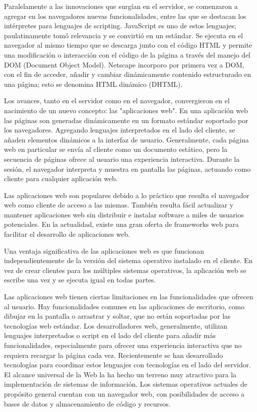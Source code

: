 \documentclass[a4paper]{report}
\begin{document}
Paralelamente a las innovaciones que surgían en el servidor, se comenzaron a 
agregar en los navegadores nuevas funcionalidades, entre las que se destacan los 
intérpretes para lenguajes de scripting. JavaScript es uno de estos lenguajes; 
paulatinamente tomó relevancia y se convirtió en un estándar. Se ejecuta en 
el navegador al mismo tiempo que se descarga junto con el código HTML y permite 
una modificación o interacción con el código de la página a través del manejo del 
DOM (Document Object Model). Netscape incorporo por primera vez a DOM, con el 
fin de acceder, añadir y cambiar dinámicamente contenido estructurado en una página; 
esto se denomina HTML dinámico (DHTML).


Los avances, tanto en el servidor como en el navegador, convergieron en el nacimiento
de un nuevo concepto: las "aplicaciones web". En una aplicación web las páginas son 
generadas dinámicamente en un formato estándar soportado por los navegadores. 
Agregando lenguajes interpretados en el lado del cliente, se añaden elementos 
dinámicos a la interfaz de usuario. Generalmente, cada página web en particular 
se envía al cliente como un documento estático, pero la secuencia de páginas 
ofrece al usuario una experiencia interactiva. Durante la sesión, el navegador 
interpreta y muestra en pantalla las páginas, actuando como cliente para cualquier aplicación web.

Las aplicaciones web son populares debido a lo práctico que resulta el navegador 
web como cliente de acceso a las mismas. También resulta fácil actualizar y mantener 
aplicaciones web sin distribuir e instalar software a miles de usuarios potenciales. 
En la actualidad, existe una gran oferta de frameworks web para facilitar el 
desarrollo de aplicaciones web.
   
Una ventaja significativa de las aplicaciones web es que funcionan 
independientemente de la versión del sistema operativo instalado en el cliente. 
En vez de crear clientes para los múltiples sistemas operativos, la aplicación web 
se escribe una vez y se ejecuta igual en todas partes.
    
Las aplicaciones web tienen ciertas limitaciones en las funcionalidades que 
ofrecen al usuario. Hay funcionalidades comunes en las aplicaciones de escritorio, 
como dibujar en la pantalla o arrastrar y soltar, que no están soportadas por 
las tecnologías web estándar. Los desarrolladores web, generalmente, utilizan 
lenguajes interpretados o script en el lado del cliente para añadir más 
funcionalidades, especialmente para ofrecer una experiencia interactiva que 
no requiera recargar la página cada vez. Recientemente se han desarrollado 
tecnologías para coordinar estos lenguajes con tecnologías en el lado del servidor.
El alcance universal de la Web la ha hecho un terreno muy atractivo para la 
implementación de sistemas de información. Los sistemas operativos actuales de 
propósito general cuentan con un navegador web, con posibilidades de acceso a 
bases de datos y almacenamiento de código y recursos.
    
\end{document}
